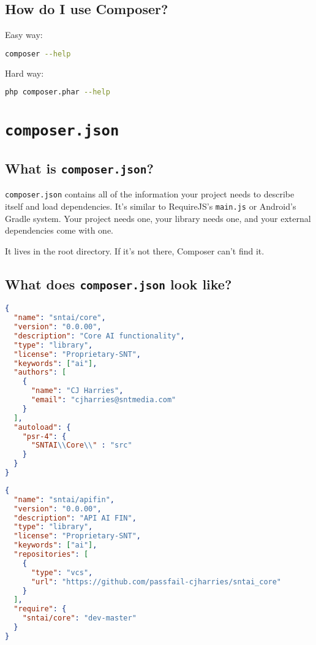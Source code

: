 \documentclass[pdf]{beamer}
\newcommand{\com}[1]{\lstinline$#1$}
\begin{document}
\subsection{How do I use Composer?}
\begin{frame}[fragile]
Easy way:
\begin{lstlisting}[language=bash]
composer --help
\end{lstlisting}
Hard way:
\begin{lstlisting}[language=bash]
php composer.phar --help
\end{lstlisting}
\end{frame}

\section{\com{composer.json}}
\subsection{What is \com{composer.json}?}
\begin{frame}
\com{composer.json} contains all of the information your project needs to describe itself and load dependencies. It's similar to RequireJS's \com{main.js} or Android's Gradle system. Your project needs one, your library needs one, and your external dependencies come with one.

It lives in the root directory. If it's not there, Composer can't find it.
\end{frame}

\subsection{What does \com{composer.json} look like?}
\begin{frame}[fragile]
\begin{lstlisting}[language=json]
{
  "name": "sntai/core",
  "version": "0.0.00",
  "description": "Core AI functionality",
  "type": "library",
  "license": "Proprietary-SNT",
  "keywords": ["ai"],
  "authors": [
    {
      "name": "CJ Harries",
      "email": "cjharries@sntmedia.com"
    }
  ],
  "autoload": {
    "psr-4": {
      "SNTAI\\Core\\" : "src"
    }
  }
}
\end{lstlisting}
\end{frame}
\begin{frame}[fragile]
\begin{lstlisting}[language=json]
{
  "name": "sntai/apifin",
  "version": "0.0.00",
  "description": "API AI FIN",
  "type": "library",
  "license": "Proprietary-SNT",
  "keywords": ["ai"],
  "repositories": [
    {
      "type": "vcs",
      "url": "https://github.com/passfail-cjharries/sntai_core"
    }
  ],
  "require": {
    "sntai/core": "dev-master"
  }
}
\end{lstlisting}
\end{frame}
\end{document}
